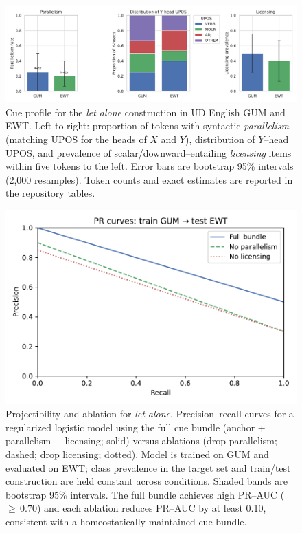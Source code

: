 \documentclass[12pt]{article}
\begin{document}
\begin{figure}[t]
  \centering
  \includegraphics[width=\linewidth]{images/let_alone_profile.pdf}
  \caption{Cue profile for the \emph{let alone} construction in UD English GUM and EWT. Left to right: proportion of tokens with syntactic \emph{parallelism} (matching UPOS for the heads of $X$ and $Y$), distribution of $Y$–head UPOS, and prevalence of scalar/downward–entailing \emph{licensing} items within five tokens to the left. Error bars are bootstrap 95\% intervals (2{,}000 resamples). Token counts and exact estimates are reported in the repository tables.}
  \label{fig:let-alone-profile}
\end{figure}

\begin{figure}[t]
  \centering
  \includegraphics[width=\linewidth]{images/let_alone_prcurve.pdf}
  \caption{Projectibility and ablation for \emph{let alone}. Precision–recall curves for a regularized logistic model using the full cue bundle (anchor + parallelism + licensing; solid) versus ablations (drop parallelism; dashed; drop licensing; dotted). Model is trained on GUM and evaluated on EWT; class prevalence in the target set and train/test construction are held constant across conditions. Shaded bands are bootstrap 95\% intervals. The full bundle achieves high PR–AUC ($\geq\,0.70$) and each ablation reduces PR–AUC by at least 0.10, consistent with a homeostatically maintained cue bundle.}
  \label{fig:let-alone-pr}
\end{figure}
\end{document}
